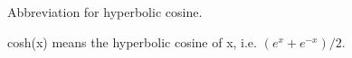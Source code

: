 Abbreviation for hyperbolic cosine.
\par
cosh(x) means the hyperbolic cosine of x, i.e. $(e^{x}+e^{-x})/2.$ 